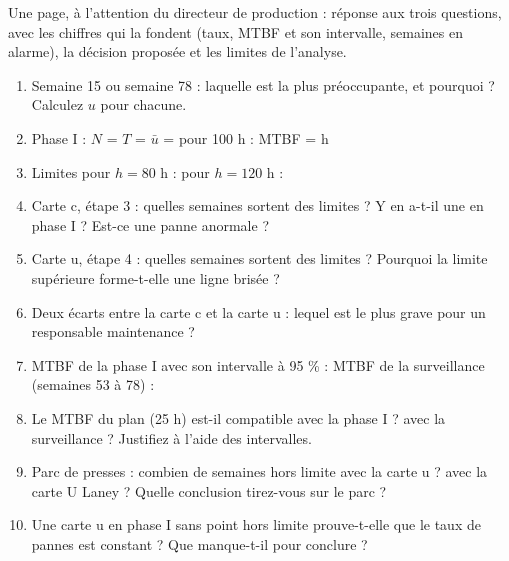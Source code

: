 \documentclass[10pt,a4paper]{article}
\begin{document}
Une page, à l'attention du directeur de production : réponse aux trois questions, avec les chiffres qui la fondent (taux, MTBF et son intervalle, semaines en alarme), la décision proposée et les limites de l'analyse.

\begin{enumerate}[label=\textcolor{cyan}{\textbf{Q\arabic*.}},leftmargin=22pt]
\item Semaine 15 ou semaine 78 : laquelle est la plus préoccupante, et pourquoi ? Calculez $u$ pour chacune.\reponse[2]
\item Phase I : $N$ = \champ{14mm} \quad $T$ = \champ{14mm} \quad $\bar u$ = \champ{18mm} \quad pour 100 h : \champ{14mm} \quad MTBF = \champ{14mm} h\par\vspace{5pt}
\item Limites pour $h = 80$ h : \champ{18mm} \quad pour $h = 120$ h : \champ{18mm}\par\vspace{5pt}
\item Carte c, étape 3 : quelles semaines sortent des limites ? Y en a-t-il une en phase I ? Est-ce une panne anormale ?\reponse[3]
\item Carte u, étape 4 : quelles semaines sortent des limites ? Pourquoi la limite supérieure forme-t-elle une ligne brisée ?\reponse[3]
\item Deux écarts entre la carte c et la carte u : lequel est le plus grave pour un responsable maintenance ?\reponse[2]
\item MTBF de la phase I avec son intervalle à 95 \% : \champ{50mm} \quad MTBF de la surveillance (semaines 53 à 78) : \champ{50mm}\par\vspace{5pt}
\item Le MTBF du plan (25 h) est-il compatible avec la phase I ? avec la surveillance ? Justifiez à l'aide des intervalles.\reponse[3]
\item Parc de presses : combien de semaines hors limite avec la carte u ? avec la carte U Laney ? Quelle conclusion tirez-vous sur le parc ?\reponse[3]
\item Une carte u en phase I sans point hors limite prouve-t-elle que le taux de pannes est constant ? Que manque-t-il pour conclure ?\reponse[3]
\end{enumerate}
\end{document}
